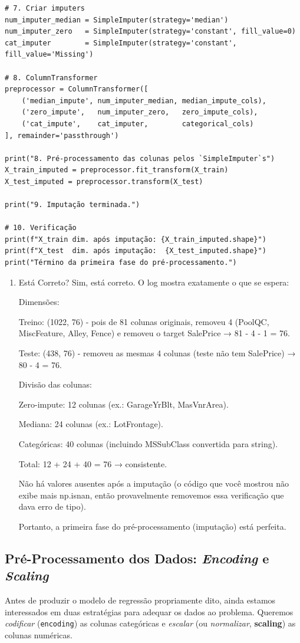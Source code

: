 \documentclass[11pt]{article}
\begin{document}
\begin{verbatim}
# 7. Criar imputers
num_imputer_median = SimpleImputer(strategy='median')
num_imputer_zero   = SimpleImputer(strategy='constant', fill_value=0)
cat_imputer        = SimpleImputer(strategy='constant', fill_value='Missing')

# 8. ColumnTransformer
preprocessor = ColumnTransformer([
    ('median_impute', num_imputer_median, median_impute_cols),
    ('zero_impute',   num_imputer_zero,   zero_impute_cols),
    ('cat_impute',    cat_imputer,        categorical_cols)
], remainder='passthrough')

print("8. Pré-processamento das colunas pelos `SimpleImputer`s")
X_train_imputed = preprocessor.fit_transform(X_train)
X_test_imputed = preprocessor.transform(X_test)

print("9. Imputação terminada.")

# 10. Verificação
print(f"X_train dim. após imputação: {X_train_imputed.shape}")
print(f"X_test  dim. após imputação:  {X_test_imputed.shape}")
print("Término da primeira fase do pré-processamento.")
\end{verbatim}
\begin{enumerate}
\item Está Correto?
\label{sec:org2454961}
Sim, está correto. O log mostra exatamente o que se espera:

Dimensões:

Treino: (1022, 76) - pois de 81 colunas originais, removeu 4 (PoolQC, MiscFeature, Alley, Fence) e removeu o target SalePrice → 81 - 4 - 1 = 76.

Teste: (438, 76) - removeu as mesmas 4 colunas (teste não tem SalePrice) → 80 - 4 = 76.

Divisão das colunas:

Zero-impute: 12 colunas (ex.: GarageYrBlt, MasVnrArea).

Mediana: 24 colunas (ex.: LotFrontage).

Categóricas: 40 colunas (incluindo MSSubClass convertida para string).

Total: 12 + 24 + 40 = 76 → consistente.

Não há valores ausentes após a imputação (o código que você mostrou não exibe mais np.isnan, então provavelmente removemos essa verificação que dava erro de tipo).

Portanto, a primeira fase do pré-processamento (imputação) está perfeita.
\end{enumerate}
\subsection{Pré-Processamento dos Dados: \emph{Encoding} e \emph{Scaling}}
\label{sec:org50e751b}
Antes de produzir o modelo de regressão propriamente dito, ainda estamos interessados em duas estratégias para adequar os dados ao problema. Queremos \emph{codificar} (\texttt{encoding}) as colunas categóricas e \emph{escalar} (ou \emph{normalizar}, \textbf{scaling}) as colunas numéricas.
\end{document}
